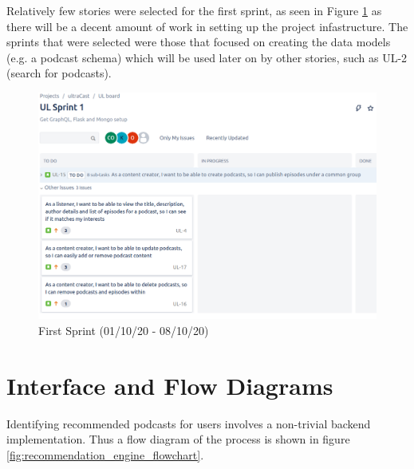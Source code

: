 \documentclass[12pt]{article}
\begin{document}
Relatively few stories were selected for the first sprint, as seen in Figure \ref{fig:first_sprint}
as there will be a decent amount of work in setting up the project infastructure. 
The sprints that were selected were those that focused on creating the data models 
(e.g. a podcast schema) which will be used later on by other stories, such as UL-2 
(search for podcasts).

\begin{figure}[ht]
    \centering
    \includegraphics[width=\textwidth]{resources/sprint1}
    \caption{First Sprint (01/10/20 - 08/10/20)}
    \label{fig:first_sprint}
\end{figure}

\section{Interface and Flow Diagrams}

Identifying recommended podcasts for users involves a non-trivial backend implementation. Thus a flow diagram of the process is shown in figure \ref{fig:recommendation_engine_flowchart}.
\end{document}
